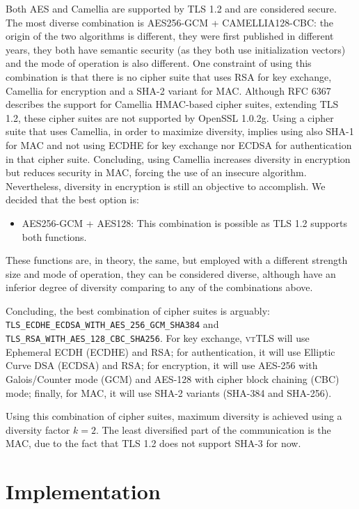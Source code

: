 \documentclass{sig-alternate-05-2015}
\newcommand{\suite}[1]{\texttt{{\footnotesize #1}}}
\begin{document}
Both AES and Camellia are supported by TLS 1.2 and are considered secure. The most diverse combination is AES256-GCM + CAMELLIA128-CBC: the origin of the two algorithms is different, they were first published in different years, they both have semantic security (as they both use initialization vectors) and the mode of operation is also different. One constraint of using this combination is that there is no cipher suite that uses RSA for key exchange, Camellia for encryption and a SHA-2 variant for MAC. Although RFC 6367 \cite{RFC6367} describes the support for Camellia HMAC-based cipher suites, extending TLS 1.2, these cipher suites are not supported by OpenSSL 1.0.2g. Using a cipher suite that uses Camellia, in order to maximize diversity, implies using also SHA-1 for MAC and not using ECDHE for key exchange nor ECDSA for authentication in that cipher suite. Concluding, using Camellia increases diversity in encryption but reduces security in MAC, forcing the use of an insecure algorithm. Nevertheless, diversity in encryption is still an objective to accomplish. We decided that the best option is:
\begin{itemize}
\item {AES256-GCM + AES128: This combination is possible as TLS 1.2 supports both functions.}
\end{itemize}
These functions are, in theory, the same, but employed with a different strength size and mode of operation, they can be considered diverse, although have an inferior degree of diversity comparing to any of the combinations above.

Concluding, the best combination of cipher suites is arguably:
\suite{TLS\_ECDHE\_ECDSA\_WITH\_AES\_256\_GCM\_SHA384} and \suite{TLS\_RSA\_WITH\_AES\_128\_CBC\_SHA256}.
For key exchange,  \textsc{vtTLS} will use Ephemeral ECDH (ECDHE) and RSA; for authentication, it will use Elliptic Curve DSA (ECDSA) and RSA; for encryption, it will use AES-256 with Galois/Counter mode (GCM) and AES-128 with cipher block chaining (CBC) mode; finally, for MAC, it will use SHA-2 variants (SHA-384 and SHA-256).

Using this combination of cipher suites, maximum diversity is achieved using a diversity factor $k = 2$. The least diversified part of the communication is the MAC, due to the fact that TLS 1.2 does not support SHA-3 for now.


\section{Implementation}
\label{sec-implementation}
\end{document}
